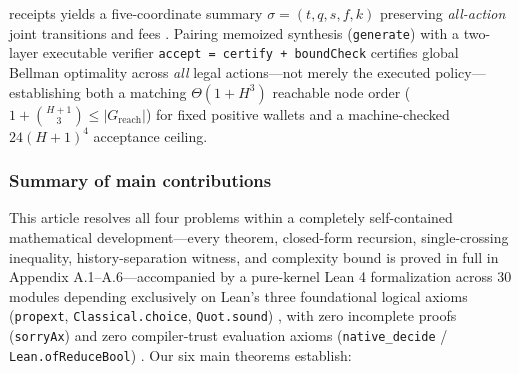 \documentclass[11pt,letterpaper]{article}
\begin{document}
\begin{enumerate}
  receipts yields a five-coordinate summary \(\sigma = (t, q, s, f, k)\)
  preserving \emph{all-action} joint transitions and fees
  \citep{halmosSavage1949, striebel1965, hinderer1970, subramanian2022}.
  Pairing memoized synthesis (\texttt{generate})
  \citep{bryant1986, bahar1997, hoey1999} with a two-layer executable
  verifier \texttt{accept\ =\ certify\ +\ boundCheck}
  \citep{blumKannan1995, mcconnell2011, nipkowPaulsonWenzel2002, bertotCasteran2004, hoelzl2017, mouraUllrich2021, schaeffelerAbdulaziz2023}
  certifies global Bellman optimality across \emph{all} legal
  actions---not merely the executed policy---establishing both a
  matching \(\Theta(1 + H^3)\) reachable node order
  (\(1 + \binom{H+1}{3} \le |G_{\mathrm{reach}}|\)) for fixed positive
  wallets and a machine-checked \(24(H+1)^4\) acceptance ceiling.
\end{enumerate}

\subsubsection{Summary of main
contributions}\label{summary-of-main-contributions}

This article resolves all four problems within a completely
self-contained mathematical development---every theorem, closed-form
recursion, single-crossing inequality, history-separation witness, and
complexity bound is proved in full in Appendix A.1--A.6---accompanied by
a pure-kernel Lean 4 formalization \citep{mouraUllrich2021, mathlib2020}
across 30 modules depending exclusively on Lean's three foundational
logical axioms (\texttt{propext}, \texttt{Classical.choice},
\texttt{Quot.sound}) \citep{carneiro2019}, with zero incomplete proofs
(\texttt{sorryAx}) and zero compiler-trust evaluation axioms
(\texttt{native\_decide} / \texttt{Lean.ofReduceBool})
\citep{boespflug2011, boutin1997}. Our six main theorems establish:
\end{document}

